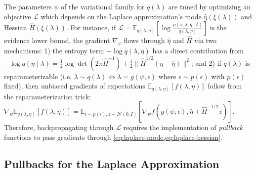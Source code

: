 \documentclass{article}
\begin{document}
The parameters $\psi$ of the variational family for $q(\lambda)$ are tuned by optimizing an objective $\mathcal{L}$ which depends on the Laplace approximation's mode $\hat{\eta}(\xi(\lambda))$ and Hessian $\hat{H}(\xi(\lambda))$.
For instance, if $\mathcal{L} = \mathbb{E}_{q(\lambda, \eta)} \left[\log \frac{p(x, \lambda, \eta \mid \delta)}{q(\lambda, \eta)}\right]$ is the evidence lower bound, the gradient $\nabla_\psi$ flows through $\hat{\eta}$ and $\hat{H}$ via two mechanisms:
1) the entropy term $-\log q(\lambda, \eta)$ has a direct contribution from $-\log q(\eta \mid \lambda) = \tfrac{1}{2}\log\det(2\pi\hat{H}^{-1}) + \tfrac{1}{2} \lVert \hat{H}^{1/2} (\eta - \hat{\eta}) \rVert^2$;
and 2) if $q(\lambda)$ is reparameterizable (i.e. $\lambda \sim q(\lambda) \Leftrightarrow \lambda = g(\psi, \epsilon)$ where $\epsilon \sim p(\epsilon)$ with $p(\epsilon)$ fixed), then unbiased gradients of expectations $\mathbb{E}_{q(\lambda, \eta)}[f(\lambda, \eta)]$ follow from the reparameterization trick:
$\nabla_\psi \mathbb{E}_{q(\lambda, \eta)}[f(\lambda, \eta)] = \mathbb{E}_{\epsilon \sim p(\epsilon), z \sim \mathcal{N}(0, I)}[\nabla_\psi f(g(\psi, \epsilon), \hat{\eta} + \hat{H}^{-1/2} z)]$.
Therefore, backpropagating through $\mathcal{L}$ requires the implementation of \textit{pullback} functions to pass gradients through \cref{eq:laplace-mode,eq:laplace-hessian}.

\subsection{Pullbacks for the Laplace Approximation}
\end{document}
